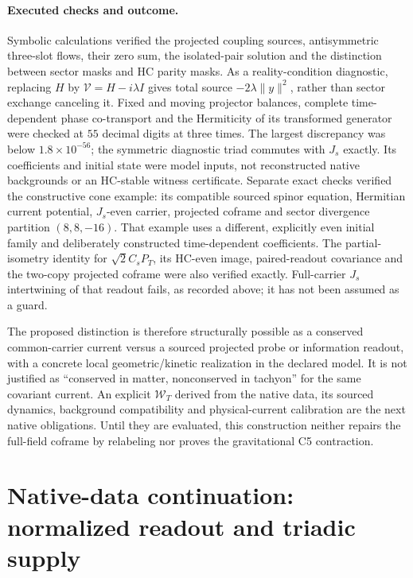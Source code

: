 \documentclass[11pt,a4paper]{article}
\begin{document}
\paragraph{Executed checks and outcome.}
Symbolic calculations verified the projected coupling sources,
antisymmetric three-slot flows, their zero sum, the isolated-pair
solution and the distinction between sector masks and HC parity masks.
As a reality-condition diagnostic, replacing $H$ by
$\mathcal V=H-i\lambda I$ gives total source
$-2\lambda\|y\|^2$, rather than sector exchange canceling it.
Fixed and moving projector balances, complete time-dependent phase
co-transport and the Hermiticity of its transformed generator were
checked at $55$ decimal digits at three times. The largest discrepancy
was below $1.8\times10^{-56}$; the symmetric diagnostic triad commutes
with $J_s$ exactly. Its coefficients and initial state were model inputs,
not reconstructed native backgrounds or an HC-stable witness certificate.
Separate exact checks verified the constructive cone example: its
compatible sourced spinor equation, Hermitian current potential,
$J_s$-even carrier, projected coframe and sector divergence partition
$(8,8,-16)$. That example uses a different, explicitly even initial
family and deliberately constructed time-dependent coefficients.
The partial-isometry identity for $\sqrt2 C_sP_T$, its HC-even image,
paired-readout covariance and the two-copy projected coframe were
also verified exactly. Full-carrier $J_s$ intertwining of that readout
fails, as recorded above; it has not been assumed as a guard.

The proposed distinction is therefore structurally possible as a
conserved common-carrier current versus a sourced projected probe or
information readout, with a concrete local geometric/kinetic realization
in the declared model. It is not justified as ``conserved in matter,
nonconserved in tachyon'' for the same covariant current. An explicit
$\mathcal W_T$ derived from the native data, its sourced dynamics,
background compatibility and
physical-current calibration are the next native obligations. Until
they are evaluated, this construction neither repairs the full-field
coframe by relabeling nor proves the gravitational C5 contraction.

\section{Native-data continuation: normalized readout and triadic supply}
\label{sec:native-normalized-readout}
\end{document}
